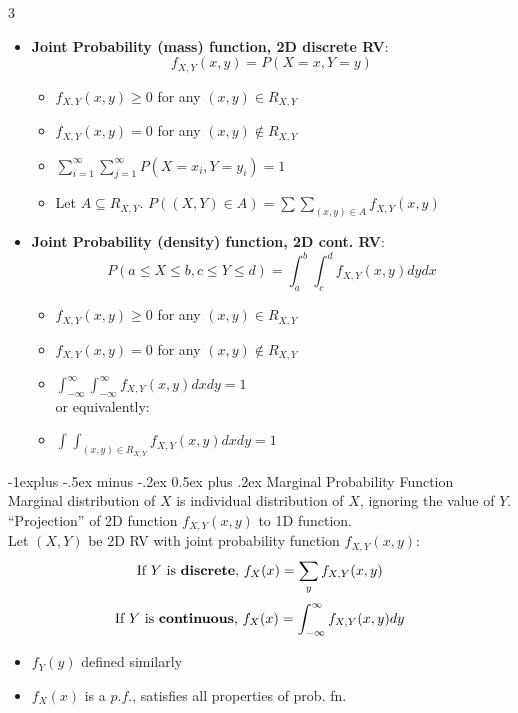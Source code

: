\documentclass[8pt, a4paper, landscape]{article}
\makeatletter
\renewcommand{\subsection}{\@startsection{subsection}{2}{0.1mm}%
                                {-1explus -.5ex minus -.2ex}%
                                {0.5ex plus .2ex}%
                                {\normalfont\normalsize\bfseries}}
\makeatother
\begin{document}
\begin{multicols*}{3}
\begin{itemize}
     \item \textbf{Joint Probability (mass) function, 2D discrete RV}:
    \[f_{X,Y} (x,y) = P(X = x, Y = y)\]
    \begin{itemize}
        \item $f_{X,Y} (x,y) \geq 0$ for any $(x,y) \in R_{X,Y}$
        \item $f_{X,Y} (x,y) = 0$ for any $(x,y) \notin R_{X,Y}$
        \item $\sum _{i=1} ^{\infty} \sum _{j=1} ^{\infty} P(X = x_i, Y = y_i) = 1$
        \item Let $A \subseteq R_{X, Y}$. $P((X,Y) \in A) = \sum \sum _{(x,y) \in A} f_{X, Y}(x,y)$
    \end{itemize}
     \item \textbf{Joint Probability (density) function, 2D cont. RV}:
    \[P(a \leq X \leq b, c \leq Y \leq d) = \int _a ^b \int _c ^d f_{X, Y} (x, y)dydx\]
    \begin{itemize}
        \item $f_{X,Y} (x,y) \geq 0$ for any $(x,y) \in R_{X,Y}$
        \item $f_{X,Y} (x,y) = 0$ for any $(x,y) \notin R_{X,Y}$
        \item $\int _{-\infty} ^{\infty} \int _{-\infty} ^{\infty} f_{X,Y} (x,y)dxdy = 1$ \\
        or equivalently:
        \item $\int _{} ^{} \int _{(x,y) \in R_{X,Y}} ^{} f_{X,Y} (x,y)dxdy = 1$
    \end{itemize}
\end{itemize}

\subsection{Marginal Probability Function}
Marginal distribution of $X$ is individual distribution of $X$, ignoring the value of $Y$. “Projection” of 2D function
$f_{X,Y}(x, y)$ to 1D function. \\
\medskip
Let $(X,Y)$ be 2D RV with joint probability function $f_{X,Y} (x,y)$:
\[\text{If $Y$ is \textbf{discrete}, } f_X(x) = \sum _y f_{X,Y} (x,y)\]
\[\text{If $Y$ is \textbf{continuous}, } f_X(x) = \int _{-\infty} ^\infty f_{X,Y} (x,y)dy\]

\begin{itemize}
    \item $f_Y (y)$ defined similarly
    \item $f_X(x)$ is a $p.f.$, satisfies all properties of prob. fn.
\end{itemize}


\end{multicols*}
\end{document}
